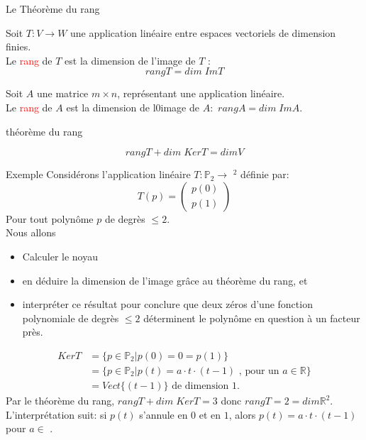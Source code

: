 \begin{parag}{Le Théorème du rang}
\begin{definition}
Soit $T : V \to W$ une application linéaire entre espaces vectoriels de dimension finies.
\\
Le \textcolor{red}{rang} de $T$ est la dimension de l'image de $T$ : 
\[rang T = dim \; ImT\]
\end{definition}

\begin{definition}
Soit $A$ une matrice $m \times n$, représentant une application linéaire.
\\
    Le \textcolor{red}{rang} de $A$ est la dimension de l0image de $A: $ $rangA = dim\; ImA$.
\end{definition}
\begin{theoreme}{théorème du rang}
    
        \[rangT + dim\; KerT  = dimV\]
    
\end{theoreme}
    \begin{subparag}{Exemple}
        Considérons l'application linéaire $T: \mathbb{P}_2 \to $ \R$^2$ définie par:
        \[T\left(p\right) = \begin{pmatrix}
            p\left(0\right) \\ p\left(1\right)
        \end{pmatrix}\]
        Pour tout polynôme $p$ de degrès $\leq 2$.
        \\
        Nous allons 
        \begin{itemize}
            \item Calculer le noyau
            \item en déduire la dimension de l'image grâce au théorème du rang, et
            \item interpréter ce résultat pour conclure que deux zéros d'une fonction polynomiale de degrès $\leq 2$ déterminent le polynôme en question à un facteur près.
        \end{itemize}

        \begin{align*}
        Ker T &= \{p \in \mathbb{P}_2 | p\left(0\right) = 0 = p\left(1\right)\}\\
            &= \{p \in \mathbb{P}_2 | p\left(t\right) = a\cdot t\cdot \left(t - 1\right) \text{ , pour un } a \in \mathbb{R}\} \\
            &= Vect\{\left(t-1\right)\} \text{ de dimension 1.}
        \end{align*}
        Par le théorème du rang, $rang T + dim\;KerT = 3$ donc $rang T = 2 = dim \mathbb{R}^2$.
        \\
        L'interprétation suit: si $p\left(t\right)$ s'annule en $0$ et en $1$, alors $p\left(t\right) = a \cdot t \cdot \left(t- 1\right)$ pour $a \in $ \R.
    \end{subparag}
\end{parag}
